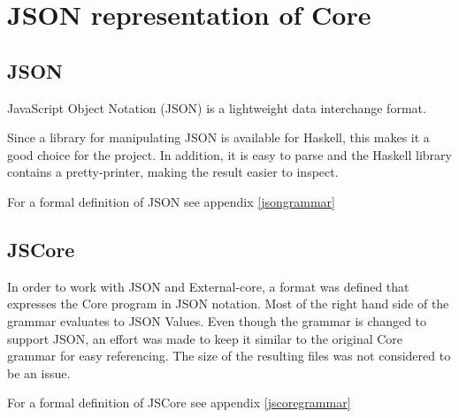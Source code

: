\section{JSON representation of Core}

\subsection{JSON}

JavaScript Object Notation (JSON) is a lightweight data interchange format.

Since a library for manipulating JSON is available for Haskell, this
makes it a good choice for the project. In addition, it is easy to parse and
the Haskell library contains a pretty-printer, making the result easier to
inspect.

For a formal definition of JSON see appendix \ref{jsongrammar}

\subsection{JSCore}

In order to work with JSON and External-core, a format was defined that
expresses the Core program in JSON notation. Most of the right hand side of 
the grammar evaluates to JSON Values. 
Even though the grammar is changed to support JSON, an effort was made to
keep it similar to the original Core grammar for easy referencing. The size
of the resulting files was not considered to be an issue.

For a formal definition of JSCore see appendix \ref{jscoregrammar}

